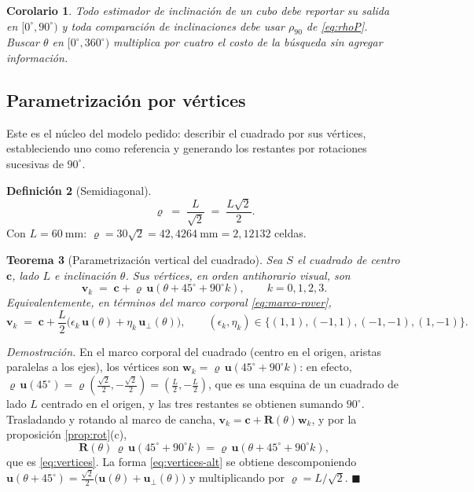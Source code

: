\documentclass[11pt,a4paper]{article}
\newtheorem{teorema}{Teorema}[section]
\newtheorem{corolario}[teorema]{Corolario}
\theoremstyle{definition}
\newtheorem{definicion}[teorema]{Definición}
\newenvironment{demo}{\par\noindent\textit{Demostración.}\;}{\hfill$\blacksquare$\par\medskip}
\newcommand{\Rot}{\mathbf{R}}
\newcommand{\uu}{\mathbf{u}}
\newcommand{\vv}{\mathbf{v}}
\newcommand{\cc}{\mathbf{c}}
\newcommand{\ww}{\mathbf{w}}
\newcommand{\grados}{^{\circ}}
\begin{document}
\begin{corolario}
Todo estimador de inclinación de un cubo debe reportar su salida en
$[0\grados,90\grados)$ y toda comparación de inclinaciones debe usar $\rho_{90}$
de \eqref{eq:rhoP}. Buscar $\theta$ en $[0\grados,360\grados)$ multiplica por cuatro el
costo de la búsqueda sin agregar información.
\end{corolario}

\subsection{Parametrización por vértices}
\label{sec:vertices}

Este es el núcleo del modelo pedido: describir el cuadrado por sus vértices,
estableciendo uno como referencia y generando los restantes por rotaciones sucesivas de
$90\grados$.

\begin{definicion}[Semidiagonal]
\begin{equation}
  \varrho \;=\; \frac{L}{\sqrt{2}} \;=\; \frac{L\sqrt2}{2}.
  \label{eq:semidiag}
\end{equation}
Con $L = 60\ \mathrm{mm}$: $\varrho = 30\sqrt2 = 42{,}4264\ \mathrm{mm} = 2{,}12132$
celdas.
\end{definicion}

\begin{teorema}[Parametrización vertical del cuadrado]
\label{teo:vertices}
Sea $S$ el cuadrado de centro $\cc$, lado $L$ e inclinación $\theta$. Sus vértices, en
orden antihorario visual, son
\begin{equation}
  \boxed{\ \vv_k \;=\; \cc + \varrho\,\uu\!\left(\theta + 45\grados + 90\grados k\right),
  \qquad k = 0,1,2,3.\ }
  \label{eq:vertices}
\end{equation}
Equivalentemente, en términos del marco corporal \eqref{eq:marco-rover},
\begin{equation}
  \vv_k \;=\; \cc + \frac{L}{2}\Big(\epsilon_k\,\uu(\theta) + \eta_k\,\uu_\perp(\theta)\Big),
  \qquad (\epsilon_k,\eta_k) \in \{(1,1),(-1,1),(-1,-1),(1,-1)\}.
  \label{eq:vertices-alt}
\end{equation}
\end{teorema}

\begin{demo}
En el marco corporal del cuadrado (centro en el origen, aristas paralelas a los ejes),
los vértices son $\ww_k = \varrho\,\uu(45\grados + 90\grados k)$: en efecto,
$\varrho\,\uu(45\grados) = \varrho(\tfrac{\sqrt2}{2}, -\tfrac{\sqrt2}{2}) =
(\tfrac{L}{2}, -\tfrac{L}{2})$, que es una esquina de un cuadrado de lado $L$ centrado
en el origen, y las tres restantes se obtienen sumando $90\grados$. Trasladando y
rotando al marco de cancha, $\vv_k = \cc + \Rot(\theta)\ww_k$, y por la proposición
\ref{prop:rot}(c),
\[
  \Rot(\theta)\,\varrho\,\uu(45\grados + 90\grados k) = \varrho\,\uu(\theta + 45\grados + 90\grados k),
\]
que es \eqref{eq:vertices}. La forma \eqref{eq:vertices-alt} se obtiene descomponiendo
$\uu(\theta+45\grados) = \tfrac{\sqrt2}{2}\big(\uu(\theta) + \uu_\perp(\theta)\big)$ y
multiplicando por $\varrho = L/\sqrt2$.
\end{demo}
\end{document}
